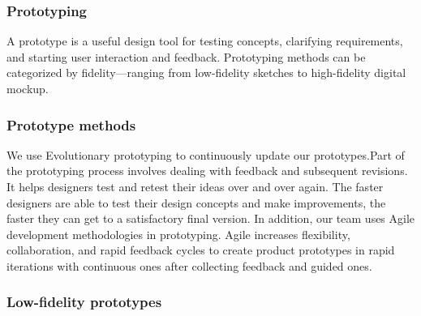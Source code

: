 \subsubsection{Prototyping}

A prototype is a useful design tool for testing concepts, clarifying requirements, and starting user interaction and feedback.
Prototyping methods can be categorized by fidelity—ranging from low-fidelity sketches to high-fidelity digital mockup.


\subsubsection{Prototype methods}
We use Evolutionary prototyping to continuously update our prototypes.Part of the prototyping process involves dealing with feedback and subsequent revisions. It helps designers test and retest their ideas over and over again. The faster designers are able to test their design concepts and make improvements, the faster they can get to a satisfactory final version. In addition, our team uses Agile development methodologies in prototyping. Agile increases flexibility, collaboration, and rapid feedback cycles to create product prototypes in rapid iterations with continuous ones after collecting feedback and guided ones.


\subsubsection{Low-fidelity prototypes}

